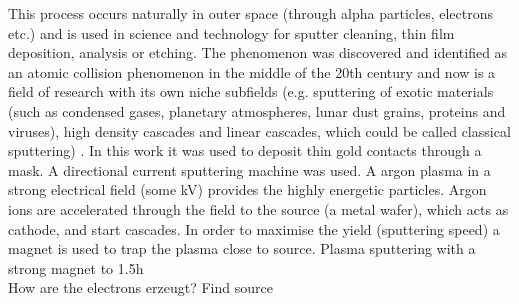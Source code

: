 This process occurs naturally in outer space (through alpha particles, electrons etc.) 
and is used in science and technology for 
sputter cleaning, thin film deposition, analysis or etching. 
The phenomenon was discovered and identified as an atomic collision phenomenon in the 
middle of the 20th century and now is a field of research with its own niche subfields 
(e.g. sputtering of exotic materials (such as condensed gases, planetary
atmospheres, lunar dust grains, proteins and viruses), high density cascades and 
linear cascades, which could be called classical sputtering)
\cite{Sigmund1987}.
%
In this work it was used to deposit thin gold contacts through a mask. 
A directional current sputtering machine was used. 
A argon plasma in a strong electrical field (some kV) provides the highly energetic particles. 
Argon ions are accelerated through the field to the source (a metal wafer), which acts as cathode, and start cascades. 
In order to maximise the yield (sputtering speed) a magnet is used to trap the plasma close to source. 
Plasma sputtering with a strong magnet to 
1.5h 
\\
How are the electrons erzeugt? 
Find source\\\\

